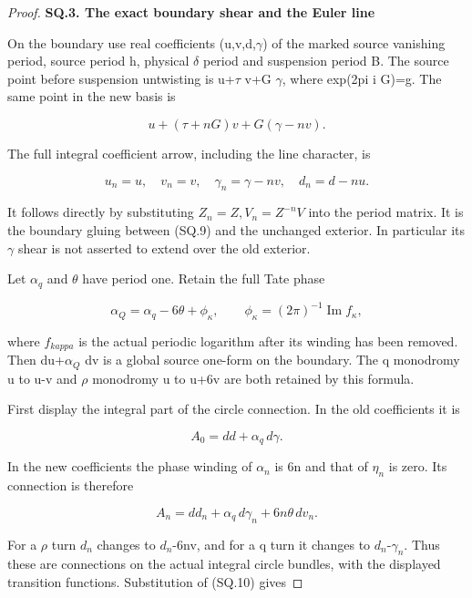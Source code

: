 \begin{proof}
\par

\medskip\noindent\textbf{SQ.3. The exact boundary shear and the Euler line}

\par\nobreak

On the boundary use real coefficients (u,v,d,\(\gamma\)) of the marked
source vanishing period, source period h, physical \(\delta\) period and
suspension period B. The source point before suspension untwisting is
u+\(\tau\) v+G \(\gamma\), where exp(2pi i G)=g. The same point in the new
basis is

\[
 u+(\tau+nG)v+G(\gamma-nv).
\]

The full integral coefficient arrow, including the line character,
is

\[
 u_n=u,\quad v_n=v,\quad
 \gamma_n=\gamma-nv,\quad d_n=d-nu.                   \tag{SQ.10}
\]

It follows directly by substituting \(Z_n=Z,V_n=Z^{-n}V\) into the
period matrix. It is the boundary gluing between (SQ.9) and the
unchanged exterior. In particular its \(\gamma\) shear is not asserted to
extend over the old exterior.

Let \(\alpha_{q}\) and \(\theta\) have period one. Retain the full Tate phase

\[
 \alpha_Q=\alpha_q-6\theta+\phi_\kappa,
 \qquad \phi_\kappa=(2\pi)^{-1}\operatorname{Im}f_\kappa,
                                                        \tag{SQ.11}
\]

where \(f_{kappa}\) is the actual periodic logarithm after its winding has
been removed. Then du+\(\alpha_{Q}\) dv is a global source one-form on the
boundary. The q monodromy u to u-v and \(\rho\) monodromy u to u+6v
are both retained by this formula.

First display the integral part of the circle connection. In the
old coefficients it is

\[
 A_0=dd+\alpha_q\,d\gamma.
\]

In the new coefficients the phase winding of \(\alpha_{n}\) is 6n and
that of \(\eta_{n}\) is zero. Its connection is therefore

\[
 A_n=dd_n+\alpha_q\,d\gamma_n+6n\theta\,dv_n.
                                                        \tag{SQ.12}
\]

For a \(\rho\) turn \(d_{n}\) changes to \(d_{n}\)-6nv, and for a q turn it changes
to \(d_{n}\)-\(\gamma_{n}\). Thus these are connections on the actual integral
circle bundles, with the displayed transition functions. Substitution
of (SQ.10) gives


\end{proof}
